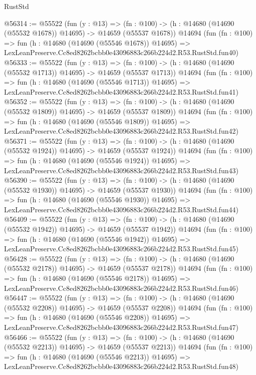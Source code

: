 \begin{lexlean}{RustStd}
\begin{coremodule}
@56314 := @55522
    (fun (y : @13) =>
    (fn : @100) -> (h : @14680 (@14690 (@55532 @1678)) @14695) -> @14659 (@55537 @1678))
    @14694
    (fun (fn : @100) =>
    fun (h : @14680 (@14690 (@55546 @1678)) @14695) =>
    LexLeanPreserve.Cc8ed8262bcbb0e43096883c266b224d2.R53.RustStd.fun40)
@56333 := @55522
    (fun (y : @13) =>
    (fn : @100) -> (h : @14680 (@14690 (@55532 @1713)) @14695) -> @14659 (@55537 @1713))
    @14694
    (fun (fn : @100) =>
    fun (h : @14680 (@14690 (@55546 @1713)) @14695) =>
    LexLeanPreserve.Cc8ed8262bcbb0e43096883c266b224d2.R53.RustStd.fun41)
@56352 := @55522
    (fun (y : @13) =>
    (fn : @100) -> (h : @14680 (@14690 (@55532 @1809)) @14695) -> @14659 (@55537 @1809))
    @14694
    (fun (fn : @100) =>
    fun (h : @14680 (@14690 (@55546 @1809)) @14695) =>
    LexLeanPreserve.Cc8ed8262bcbb0e43096883c266b224d2.R53.RustStd.fun42)
@56371 := @55522
    (fun (y : @13) =>
    (fn : @100) -> (h : @14680 (@14690 (@55532 @1924)) @14695) -> @14659 (@55537 @1924))
    @14694
    (fun (fn : @100) =>
    fun (h : @14680 (@14690 (@55546 @1924)) @14695) =>
    LexLeanPreserve.Cc8ed8262bcbb0e43096883c266b224d2.R53.RustStd.fun43)
@56390 := @55522
    (fun (y : @13) =>
    (fn : @100) -> (h : @14680 (@14690 (@55532 @1930)) @14695) -> @14659 (@55537 @1930))
    @14694
    (fun (fn : @100) =>
    fun (h : @14680 (@14690 (@55546 @1930)) @14695) =>
    LexLeanPreserve.Cc8ed8262bcbb0e43096883c266b224d2.R53.RustStd.fun44)
@56409 := @55522
    (fun (y : @13) =>
    (fn : @100) -> (h : @14680 (@14690 (@55532 @1942)) @14695) -> @14659 (@55537 @1942))
    @14694
    (fun (fn : @100) =>
    fun (h : @14680 (@14690 (@55546 @1942)) @14695) =>
    LexLeanPreserve.Cc8ed8262bcbb0e43096883c266b224d2.R53.RustStd.fun45)
@56428 := @55522
    (fun (y : @13) =>
    (fn : @100) -> (h : @14680 (@14690 (@55532 @2178)) @14695) -> @14659 (@55537 @2178))
    @14694
    (fun (fn : @100) =>
    fun (h : @14680 (@14690 (@55546 @2178)) @14695) =>
    LexLeanPreserve.Cc8ed8262bcbb0e43096883c266b224d2.R53.RustStd.fun46)
@56447 := @55522
    (fun (y : @13) =>
    (fn : @100) -> (h : @14680 (@14690 (@55532 @2208)) @14695) -> @14659 (@55537 @2208))
    @14694
    (fun (fn : @100) =>
    fun (h : @14680 (@14690 (@55546 @2208)) @14695) =>
    LexLeanPreserve.Cc8ed8262bcbb0e43096883c266b224d2.R53.RustStd.fun47)
@56466 := @55522
    (fun (y : @13) =>
    (fn : @100) -> (h : @14680 (@14690 (@55532 @2213)) @14695) -> @14659 (@55537 @2213))
    @14694
    (fun (fn : @100) =>
    fun (h : @14680 (@14690 (@55546 @2213)) @14695) =>
    LexLeanPreserve.Cc8ed8262bcbb0e43096883c266b224d2.R53.RustStd.fun48)

\end{coremodule}
\end{lexlean}
